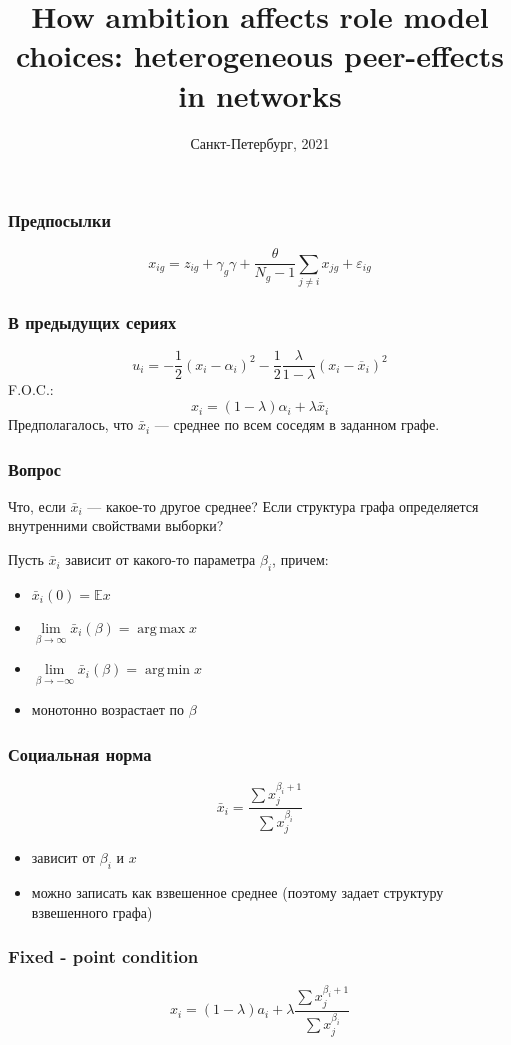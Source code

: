 \documentclass[unicode]{beamer}
\title[Оптимальные планы для оценивания производных]{How ambition affects role model choices: heterogeneous peer-effects in networks}
\date{Санкт-Петербург, 2021}
\DeclareMathOperator*{\argmax}{arg\,max}
\DeclareMathOperator*{\argmin}{arg\,min}
\begin{document}
\begin{frame}
    \titlepage
\end{frame}

\begin{frame}
\frametitle{Предпосылки}
	$$
	x_{ig} = z_{ig} + \gamma_g \gamma + \frac{\theta}{N_g - 1} \sum\limits_{j \neq i} x_{jg} + \varepsilon_{ig}
	$$
\end{frame}

\begin{frame}
\frametitle{В предыдущих сериях}
	$$
	u_i = -\frac{1}{2}(x_i-\alpha_i)^2-\frac{1}{2}\frac{\lambda}{1-\lambda}\left(x_i - \overline{x}_i\right)^2
	$$
	F.O.C.:
	$$
	x_i = (1- \lambda)\alpha_i + \lambda \bar{x}_i
	$$
	Предполагалось,  что $\bar{x}_i$ --- среднее по всем соседям в заданном графе.
\end{frame}

\begin{frame}
\frametitle{Вопрос}
	Что, если $\bar{x}_i$ --- какое-то другое среднее? Если структура графа определяется внутренними свойствами выборки?
	
	Пусть $\bar{x}_i$ зависит от какого-то параметра $\beta_i$,  причем:
	\begin{itemize}
	\item $\bar{x}_i(0) = \mathbb{E}x$
	\item $\lim\limits_{\beta \to \infty} \bar{x}_i(\beta) = \argmax x$
	\item $\lim\limits_{\beta \to -\infty} \bar{x}_i(\beta) = \argmin x$
	\item монотонно возрастает по $\beta$
	\end{itemize}
\end{frame}

\begin{frame}
\frametitle{Социальная норма}
$$
\bar{x}_i = \frac{\sum x_j^{\beta_i + 1}}{\sum x_j^{\beta_i}}
$$
\begin{itemize}
	\item зависит от $\beta_i$ и $x$
	\item можно записать как взвешенное среднее (поэтому задает структуру взвешенного графа)
	
\end{itemize}
\end{frame}

\begin{frame}
\frametitle{Fixed - point condition}
	$$
	x_i = (1 - \lambda) a_i + \lambda \frac{\sum x_j^{\beta_i + 1}}{\sum x_j^{\beta_i}}
	$$
\end{frame}
\end{document}
